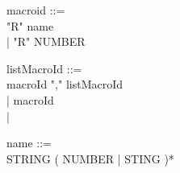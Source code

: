 \begin{appendices}
macroid ::= \\
\tab "R" name \\
\tab | "R" NUMBER 

listMacroId ::= \\
\tab macroId "," listMacroId \\
\tab | macroId \\
\tab | 

name ::= \\
\tab STRING ( NUMBER | STING )*


\end{appendices}